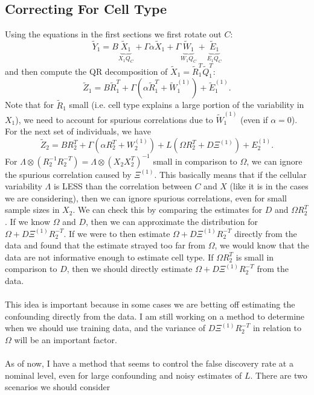 \documentclass{article}
\begin{document}
\subsection{Correcting For Cell Type}
Using the equations in the first sections we first rotate out $C$:
\[
\tilde{Y}_1 = B\underbrace{\tilde{X}_1}_{X_1Q_C} + \Gamma \alpha \tilde{X}_1 + \Gamma \underbrace{\tilde{W}_1}_{W_1 Q_C} + \underbrace{\tilde{E}_1}_{E_1 Q_C}
\]
and then compute the QR decomposition of $\tilde{X}_1 = \tilde{R}_1^T\tilde{Q}_1^T $:
\[
\tilde{Z}_1 = B\tilde{R}_1^T + \Gamma \left( \alpha \tilde{R}_1^T + \tilde{W}_1^{(1)} \right) + \tilde{E}_1^{(1)}.
\]
Note that for $\tilde{R}_1$ small (i.e. cell type explains a large portion of the variability in $X_1$), we need to account for spurious correlations due to $\tilde{W}_1^{(1)}$ (even if $\alpha = 0$). For the next set of individuals, we have
\[
\tilde{Z}_2 = BR_2^T + \Gamma\left( \alpha R_2^T + W_2^{(1)} \right) + L\left( \Omega R_2^T + D\Xi^{(1)} \right) + E_2^{(1)}.
\]
For $\Lambda \otimes \left( R_2^{-1}R_2^{-T} \right) = \Lambda \otimes \left( X_2 X_2^T \right)^{-1}$ small in comparison to $\Omega$, we can ignore the spurious correlation caused by $\Xi^{(1)}$. This basically means that if the cellular variability $\Lambda$ is LESS than the correlation between $C$ and $X$ (like it is in the cases we are considering), then we can ignore spurious correlations, even for small sample sizes in $X_2$. We can check this by comparing the estimates for $D$ and $\Omega R_2^T$. If we know $\Omega$ and $D$, then we can approximate the distribution for $\Omega + D\Xi^{(1)}R_2^{-T}$. If we were to then estimate $\Omega + D\Xi^{(1)}R_2^{-T}$ directly from the data and found that the estimate strayed too far from $\Omega$, we would know that the data are not informative enough to estimate cell type. If $\Omega R_2^T$ is small in comparison to $D$, then we should directly estimate $\Omega + D\Xi^{(1)}R_2^{-T}$ from the data.\\
\\
This idea is important because in some cases we are betting off estimating the confounding directly from the data. I am still working on a method to determine when we should use training data, and the variance of $D\Xi^{(1)}R_2^{-T}$ in relation to $\Omega$ will be an important factor.\\
\\
As of now, I have a method that seems to control the false discovery rate at a nominal level, even for large confounding and noisy estimates of $L$. There are two scenarios we should consider
\end{document}
